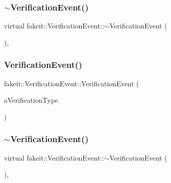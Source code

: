 \subsubsection{\texorpdfstring{$\sim$VerificationEvent()}{~VerificationEvent()}\hspace{0.1cm}{\footnotesize\ttfamily [4/9]}}
{\footnotesize\ttfamily virtual fakeit\+::\+Verification\+Event\+::$\sim$\+Verification\+Event (\begin{DoxyParamCaption}{ }\end{DoxyParamCaption})\hspace{0.3cm}{\ttfamily [virtual]}, {\ttfamily [default]}}

\mbox{\label{structfakeit_1_1VerificationEvent_afc2366f1ae4d03ec60cc2a2253a79728}} 
\subsubsection{\texorpdfstring{VerificationEvent()}{VerificationEvent()}\hspace{0.1cm}{\footnotesize\ttfamily [5/9]}}
{\footnotesize\ttfamily fakeit\+::\+Verification\+Event\+::\+Verification\+Event (\begin{DoxyParamCaption}\item[{\mbox{\hyperlink{namespacefakeit_a9df22520dd60badb149c1d1d2518b253}{Verification\+Type}}}]{a\+Verification\+Type }\end{DoxyParamCaption})\hspace{0.3cm}{\ttfamily [inline]}}

\mbox{\label{structfakeit_1_1VerificationEvent_a5bcca5502a6be4d65db30c1927652a77}} 
\subsubsection{\texorpdfstring{$\sim$VerificationEvent()}{~VerificationEvent()}\hspace{0.1cm}{\footnotesize\ttfamily [5/9]}}
{\footnotesize\ttfamily virtual fakeit\+::\+Verification\+Event\+::$\sim$\+Verification\+Event (\begin{DoxyParamCaption}{ }\end{DoxyParamCaption})\hspace{0.3cm}{\ttfamily [virtual]}, {\ttfamily [default]}}

